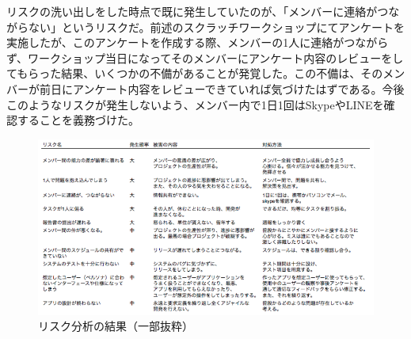 \documentclass[openany,11pt,papersize]{jsbook}
\begin{document}
\par リスクの洗い出しをした時点で既に発生していたのが、「メンバーに連絡がつながらない」というリスクだ。前述のスクラッチワークショップにてアンケートを実施したが、このアンケートを作成する際、メンバーの1人に連絡がつながらず、ワークショップ当日になってそのメンバーにアンケート内容のレビューをしてもらった結果、いくつかの不備があることが発覚した。この不備は、そのメンバーが前日にアンケート内容をレビューできていれば気づけたはずである。今後このようなリスクが発生しないよう、メンバー内で1日1回はSkypeやLINEを確認することを義務づけた。

\begin{figure}[H]
\begin{center}
\includegraphics[width=14cm, bb=0 0 753 394]{img/RiskManagement.png}
\end{center}
\caption{リスク分析の結果（一部抜粋）}
\end{figure}

\end{document}
